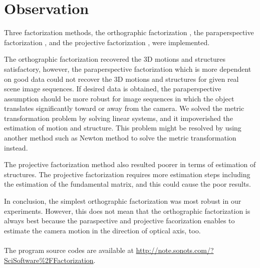 \newpage

\chapter{Observation}

Three factorization methods, the orthographic factorization  \cite{Tomasi}, the paraperspective factorization \cite{Poelman}, and the projective factorization \cite{Triggs}, were implemented. 

The orthographic factorization recovered the 3D motions and structures satisfactory, however, the paraperspective factorization which is more dependent on good data could not recover the 3D motions and structures for given real scene image sequences. If desired data is obtained, the paraperspective assumption should be more robust for image sequences in which the object translates significantly toward or away from the camera. 
We solved the metric transformation problem by solving linear systems, and it impoverished the estimation of motion and structure. This problem might be resolved by using another method such as Newton method to solve the metric transformation instead. 

The projective factorization method also resulted poorer in terms of estimation of structures. 
The projective factorization requires more estimation steps including the estimation of the fundamental matrix, and this could cause the poor results. 
 
In conclusion, the simplest orthographic factorization was most robust in our experiments. However, this does not mean that the orthographic factorization is always best because the paraspective and projective facorization enables to estimate the camera motion in the direction of optical axis, too. 
\\
\\
The program source codes are available at \url{http://note.sonots.com/?SciSoftware%2FFactorization}.


